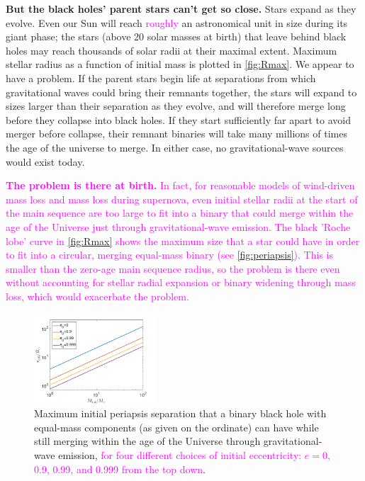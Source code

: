 \documentclass[iop,onecolumn]{revtex4}
\newcommand{\ilya}[1]{\textcolor{magenta}{#1}}
\begin{document}
\textbf{But the black holes' parent stars can't get so close.} Stars expand as they evolve. Even our Sun will reach \ilya{roughly} an astronomical unit in size during its giant phase; the stars (above 20 solar masses at birth) that leave behind black holes may reach thousands of solar radii at their maximal extent. Maximum stellar radius as a function of initial mass is plotted in \autoref{fig:Rmax}. We appear to have a problem. If the parent stars begin life at separations from which gravitational waves could bring their remnants together, the stars will expand to sizes larger than their separation as they evolve, and will therefore merge long before they collapse into black holes. If they start sufficiently far apart to avoid merger before collapse, their remnant binaries will take many millions of times the age of the universe to merge. In either case, no gravitational-wave sources would exist today. 

\ilya{\textbf{The problem is there at birth.} In fact, for reasonable models of wind-driven mass loss and mass loss during supernova, even initial stellar radii at the start of the main sequence are too large to fit into a binary that could merge within the age of the Universe just through gravitational-wave emission.  The black 'Roche lobe' curve in \autoref{fig:Rmax} shows the maximum size that a star could have in order to fit into a circular, merging equal-mass binary (see \autoref{fig:periapsis}).  This is smaller than the zero-age main sequence radius, so the problem is there even without accounting for stellar radial expansion or binary widening through mass loss, which would exacerbate the problem.}

 
\begin{figure}
	\centering
	\includegraphics[width=0.4\textwidth]{M-rp-log.png}
	\caption{Maximum initial periapsis separation that a binary black hole with equal-mass components (as given on the ordinate) can have while still merging within the age of the Universe through gravitational-wave emission, \ilya{for four different choices of initial eccentricity: $e=0$, 0.9, 0.99, and 0.999 from the top down}.\label{fig:periapsis}}
\end{figure}
	
\end{document}
